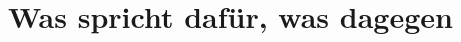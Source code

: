 \documentclass[10pt,a4paper]{article} %
\begin{document}
% 


\newpage



\part*{Was spricht dafür, was dagegen}
\end{document}
